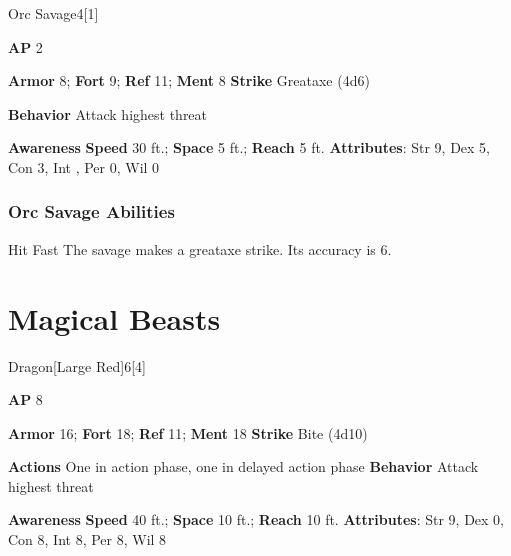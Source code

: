 \begin{monsection}{Orc Savage}{4}[1]
\vspace{-1em}\vspace{-1em}
\begin{spellcontent}
\begin{spelltargetinginfo}
{\textbf{AP} 2}

\pari \textbf{Armor} 8;
\textbf{Fort} 9;
\textbf{Ref} 11;
\textbf{Ment} 8
\pari \textbf{Strike} Greataxe  (4d6)



\pari \textbf{Behavior} Attack highest threat
\end{spelltargetinginfo}
\end{spellcontent}

\begin{monsterfooter}
\pari \textbf{Awareness} 
\pari \textbf{Speed} 30 ft.;
\textbf{Space} 5 ft.;
\textbf{Reach} 5 ft.
\pari \textbf{Attributes}:
Str 9,
Dex 5,
Con 3,
Int ,
Per 0,
Wil 0
\end{monsterfooter}
\end{monsection}


\subsubsection{Orc Savage Abilities}

\begin{freeability}{Hit Fast}
The savage makes a greataxe strike.
Its accuracy is 6.
\end{freeability}

\section{Magical Beasts}
\begin{monsection}{Dragon}[Large Red]{6}[4]
\vspace{-1em}\vspace{-1em}
\begin{spellcontent}
\begin{spelltargetinginfo}
{\textbf{AP} 8}

\pari \textbf{Armor} 16;
\textbf{Fort} 18;
\textbf{Ref} 11;
\textbf{Ment} 18
\pari \textbf{Strike} Bite  (4d10)


\pari \textbf{Actions} One in action phase, one in delayed action phase
\pari \textbf{Behavior} Attack highest threat
\end{spelltargetinginfo}
\end{spellcontent}

\begin{monsterfooter}
\pari \textbf{Awareness} 
\pari \textbf{Speed} 40 ft.;
\textbf{Space} 10 ft.;
\textbf{Reach} 10 ft.
\pari \textbf{Attributes}:
Str 9,
Dex 0,
Con 8,
Int 8,
Per 8,
Wil 8
\end{monsterfooter}
\end{monsection}

